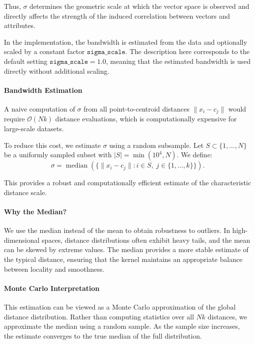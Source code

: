 Thus, $\sigma$ determines the geometric scale at which the vector space is observed and directly affects the strength of the induced correlation between vectors and attributes.

In the implementation, the bandwidth is estimated from the data and optionally scaled by a constant factor $\texttt{sigma\_scale}$. The description here corresponds to the default setting $\texttt{sigma\_scale} = 1.0$, meaning that the estimated bandwidth is used directly without additional scaling.

\paragraph{Bandwidth Estimation}

A naive computation of $\sigma$ from all point-to-centroid distances $\|x_i - c_j\|$ would require $\mathcal{O}(Nk)$ distance evaluations, which is computationally expensive for large-scale datasets.

To reduce this cost, we estimate $\sigma$ using a random subsample. Let $S \subset \{1,\dots,N\}$ be a uniformly sampled subset with $|S| = \min(10^4, N)$. We define:
\[
\sigma = \operatorname{median}\left(\{ \|x_i - c_j\| : i \in S,\; j \in \{1,\dots,k\} \}\right).
\]

This provides a robust and computationally efficient estimate of the characteristic distance scale.

\paragraph{Why the Median?}

We use the median instead of the mean to obtain robustness to outliers. In high-dimensional spaces, distance distributions often exhibit heavy tails, and the mean can be skewed by extreme values. The median provides a more stable estimate of the typical distance, ensuring that the kernel maintains an appropriate balance between locality and smoothness.

\paragraph{Monte Carlo Interpretation}

This estimation can be viewed as a Monte Carlo approximation of the global distance distribution. Rather than computing statistics over all $Nk$ distances, we approximate the median using a random sample. As the sample size increases, the estimate converges to the true median of the full distribution.

